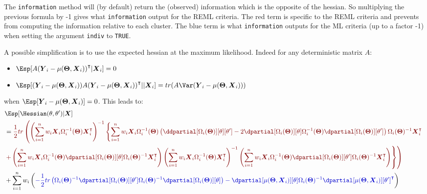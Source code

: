 \documentclass[12pt]{article}
\newcommand{\darkblue}{blue!80!black}
\newcommand{\darkred}{red!50!black}
\newcommand\trans[1]{{#1}^\intercal}%
\newcommand{\param}{\Theta}
\newcommand{\Vparam}{\boldsymbol{\param}}
\newcommand{\VX}{\boldsymbol{X}}
\newcommand{\VY}{\boldsymbol{Y}}
\begin{document}
\bigskip

The \texttt{information} method will (by default) return the (observed)
information which is the opposite of the hessian. So multiplying the
previous formula by -1 gives what \texttt{information} output for the REML
criteria. The red term is specific to the REML criteria and prevents
from computing the information relative to each cluster. The blue term
is what \texttt{information} outputs for the ML criteria (up to a factor -1)
when setting the argument \texttt{indiv} to \texttt{TRUE}.

\bigskip

A possible simplification is to use the expected hessian at the maximum likelihood. Indeed for
any deterministic matrix \(A\):
\begin{itemize}
\item \(\Esp[A \trans{(\VY_i-\mu(\Vparam,\VX_i))}|\VX_i] = 0\)
\item \(\Esp[(\VY_i-\mu(\Vparam,\VX_i)) A \trans{(\VY_i-\mu(\Vparam,\VX_i))}||\VX_i] = tr(A \Var(\VY_i-\mu(\Vparam,\VX_i)))\)
\end{itemize}
when \(\Esp[\VY_i-\mu(\Vparam,\VX_i)]=0\). This leads to:
\begin{align}
 & \Esp[\Hessian(\theta,\theta^{\prime})|\VX] \notag\\ 
 &= \textcolor{\darkred}{ \frac{1}{2} tr \left( \left(\sum_{i=1}^n w_i \VX_i \Omega_i^{-1}(\Vparam) \trans{\VX}_i\right)^{-1}  \left\{ \sum_{i=1}^n w_i \VX_i \Omega_i^{-1}(\Vparam) \left( \ddpartial[\Omega_i(\Vparam)][\theta][\theta^{\prime}] - 2 \dpartial[\Omega_i(\Vparam)][\theta]  \Omega_i^{-1}(\Vparam) \dpartial[\Omega_i(\Vparam)][\theta^{\prime}]\right) \Omega_i(\Vparam)^{-1} \trans{\VX}_i \right.  \right.} \notag \\
 & \textcolor{\darkred}{ \left. \left. +  \left(\sum_{i=1}^n w_i \VX_i \Omega_i^{-1}(\Vparam) \dpartial[\Omega_i(\Vparam)][\theta] \Omega_i(\Vparam)^{-1} \trans{\VX}_i\right) \left(\sum_{i=1}^n w_i \VX_i \Omega_i^{-1}(\Vparam) \trans{\VX}_i \right)^{-1} \left(\sum_{i=1}^n w_i \VX_i \Omega_i^{-1}(\Vparam) \dpartial[\Omega_i(\Vparam)][\theta^{\prime}] \Omega_i(\Vparam)^{-1} \trans{\VX}_i\right) \right\} \right) } \notag\\
 & + \sum_{i=1}^n w_i \left( \textcolor{\darkblue}{
- \frac{1}{2} tr\left(\Omega_i(\Vparam)^{-1} \dpartial[\Omega_i(\Vparam)][\theta^{\prime}] \Omega_i(\Vparam)^{-1} \dpartial[\Omega_i(\Vparam)][\theta]\right)
 - \dpartial[\mu(\Vparam,\VX_i)][\theta] \Omega_i(\Vparam)^{-1} \trans{\dpartial[\mu(\Vparam,\VX_i)][\theta^{\prime}]}
 } \right) \label{eq:expectedInfo} 
\end{align}
\end{document}
